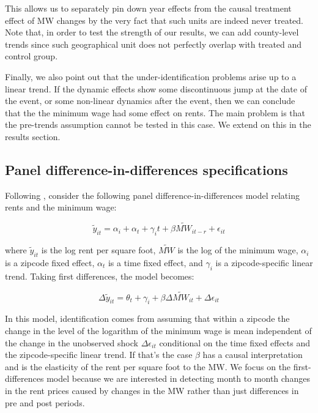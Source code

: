     This allows us to separately pin down year effects from the causal treatment effect of MW changes by the very fact that such units are indeed never treated. Note that, in order to test the strength of our results, we can add county-level trends since such geographical unit does not perfectly overlap with treated and control group.
    
    Finally, we also point out that the under-identification problems arise up to a linear trend. If the dynamic effects show some discontinuous jump at the date of the event, or some non-linear dynamics after the event, then we can conclude that the the minimum wage had some effect on rents. The main problem is that the pre-trends assumption cannot be tested in this case. We extend on this in the results section.

\subsection{Panel difference-in-differences specifications} \label{subsec:empirical_strategy/first-difference}

Following \textcite{meer2016effects}, consider the following panel difference-in-differences model relating rents and the minimum wage:

\begin{equation}\label{eq:diff_main}
        \tilde{y}_{it} = \alpha_i + \alpha_t + \gamma_i t + \beta \tilde{MW}_{it-r} + \epsilon_{it}
\end{equation}
    
    where $\tilde{y}_{it}$ is the log rent per square foot, $\tilde{MW}$ is the log of the minimum wage, $\alpha_i$ is a zipcode fixed effect, $\alpha_t$ is a time fixed effect, and $\gamma_i$ is a zipcode-specific linear trend. Taking first differences, the model becomes:
    
\begin{equation}\label{eq:diff_main}
        \Delta \tilde{y}_{it} = \theta_t + \gamma_i + \beta \Delta \tilde{MW}_{it}+ \Delta \epsilon_{it}
\end{equation}
    
    In this model, identification comes from assuming that within a zipcode the change in the level of the logarithm of the minimum wage is mean independent of the change in the unobserved shock $\Delta \epsilon_{it}$ conditional on the time fixed effects and the zipcode-specific linear trend. If that's the case $\beta$ has a causal interpretation and is the elasticity of the rent per square foot to the MW. We focus on the first-differences model because we are interested in detecting month to month changes in the rent prices caused by changes in the MW rather than just differences in pre and post periods.
    
